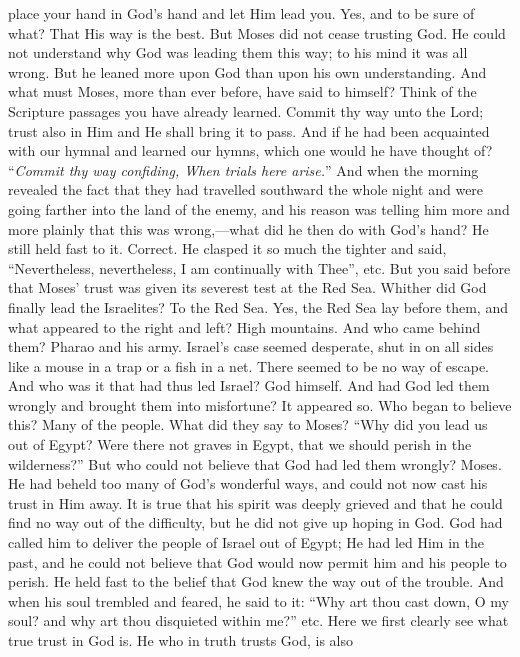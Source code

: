 place your hand in God’s hand and let Him lead you. Yes, and to be sure of what? That His way is the best. But Moses did not cease trusting God. He could not understand why God was leading them this way; to his mind it was all wrong. But he leaned more upon God than upon his own understanding. And what must Moses, more than ever before, have said to himself? Think of the Scripture passages you have already learned. Commit thy way unto the Lord; trust also in Him and He shall bring it to pass. And if he had been acquainted with our hymnal and learned our hymns, which one would he have thought of? “\emph{Commit thy way confiding, When trials here arise.}” And when the morning revealed the fact that they had travelled southward the whole night and were going farther into the land of the enemy, and his reason was telling him more and more plainly that this was wrong,—what did he then do with God’s hand? He still held fast to it. Correct. He clasped it so much the tighter and said, “Nevertheless, nevertheless, I am continually with Thee”, etc. But you said before that Moses’ trust was given its severest test at the Red Sea. Whither did God finally lead the Israelites? To the Red Sea. Yes, the Red Sea lay before them, and what appeared to the right and left? High mountains. And who came behind them? Pharao and his army. Israel’s case seemed desperate, shut in on all sides like a mouse in a trap or a fish in a net. There seemed to be no way of escape. And who was it that had thus led Israel? God himself. And had God led them wrongly and brought them into misfortune? It appeared so. Who began to believe this? Many of the people. What did they say to Moses? “Why did you lead us out of Egypt? Were there not graves in Egypt, that we should perish in the wilderness?” But who could not believe that God had led them wrongly? Moses. He had beheld too many of God’s wonderful ways, and could not now cast his trust in Him away. It is true that his spirit was deeply grieved and that he could find no way out of the difficulty, but he did not give up hoping in God. God had called him to deliver the people of Israel out of Egypt; He had led Him in the past, and he could not believe that God would now permit him and his people to perish. He held fast to the belief that God knew the way out of the trouble. And when his soul trembled and feared, he said to it: “Why art thou cast down, O my soul? and why art thou disquieted within me?” etc. Here we first clearly see what true trust in God is. He who in truth trusts God, is also
